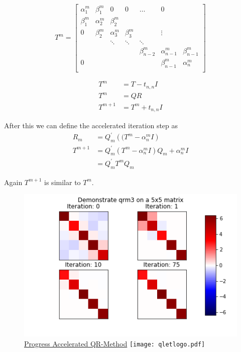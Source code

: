 \documentclass[12pt]{article}
\begin{document}
\begin{equation}
\label{qrm3-prop}
T^{m} = \begin{bmatrix}

\alpha^{m}_1 & \beta^{m}_1  & 0            & 0            & \dots            & 0                                  \\
\beta^{m}_1  & \alpha^{m}_2 & \beta^{m}_2                                                                         \\
0            & \beta^{m}_2  & \alpha^{m}_3 & \beta^{m}_3  &                  & \vdots                             \\
             &              & \ddots       & \ddots       & \ddots                                                \\
             &              &              &              & \beta^{m}_{n-2}  & \alpha^{m}_{n-1} & \beta^{m}_{n-1} \\
0            &              &              &              &                  & \beta^{m}_{n-1}  & \alpha^{m}_n    \\

\end{bmatrix}
\end{equation}


\begin{align*}
T^{m}       &= T - t _{n, n} I \\
T^{m}       &= QR \\
T^{m+1}     &= T^{m} + t _{n, n} I
\end{align*}

After this we can define the accelerated iteration step as
\begin{align}
\label{qrm3}
R_m &= Q^{\prime}_m\left((T^m - \alpha_n^{m}I\right) \\
T^{m+1} &= Q^{\prime}_m\left(T^m - \alpha_n^{m}I\right)Q_m + \alpha_n^{m}I \\
        &= Q^{\prime}_m T^m Q_m
\end{align}

Again $T^{m+1}$ is similar to $T^m$.

\begin{figure}[b]
\centering
\caption{\href {https://github.com/thsis/NIS18/tree/master/media/plots}{Progress Accelerated QR-Method}  \protect\texttt{[image: qletlogo.pdf]}}
  \label{qr3-plot}
  \includegraphics[scale=0.6]{../media/plots/qrm3.png}
\end{figure}
\end{document}
